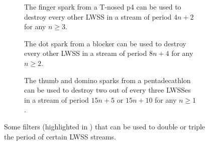 \begin{figure}[!htb]
	\centering
	\begin{subfigure}{0.28\textwidth}
		\centering
		\caption{The finger spark from a T-nosed p4 can be used to destroy every other LWSS in a stream of period $4n+2$ for any $n \geq 3$.}\label{fig:lwss_filter_tnosed_p4}
	\end{subfigure} \hfill \begin{subfigure}{0.35\textwidth}
		\centering\vspace*{0cm}
		\caption{The dot spark from a blocker can be used to destroy every other LWSS in a stream of period $8n+4$ for any $n \geq 2$.}\label{fig:lwss_filter_blocker}
	\end{subfigure} \hfill \begin{subfigure}{0.335\textwidth}
		\centering
		\caption{The thumb and domino sparks from a pentadecathlon can be used to destroy two out of every three LWSSes in a stream of period $15n+5$ or $15n+10$ for any $n \geq 1$.}\label{fig:lwss_filter_pentadecathlon}
	\end{subfigure}
	\caption{Some filters (highlighted in ) that can be used to double or triple the period of certain LWSS streams.}\label{fig:lwss_filters}
\end{figure}





